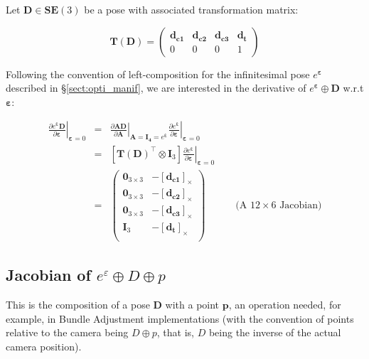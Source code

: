\documentclass[a4paper,11pt]{report}
\newcommand{\E}{{\bm{\varepsilon}}}
\begin{document}
Let $\mathbf{D} \in \mathbf{SE}(3)$ be a pose with associated transformation matrix:

\begin{equation}
\mathbf{T}(\mathbf{D}) = 
\left(
\begin{array}{ccc|c}
 \mathbf{d_{c1}}  & \mathbf{d_{c2}}  & \mathbf{d_{c3}}  & \mathbf{d_{t}}  \\
\hline
  0 & 0 & 0 & 1
\end{array}
\right) 
\end{equation}

Following the convention of left-composition for the infinitesimal 
pose $e^\E$ described in \S\ref{sect:opti_manif},
we are interested in the derivative of $e^\E \oplus \mathbf{D}$ w.r.t $\E$:

\begin{eqnarray}
\left. \frac{\partial e^\E \mathbf{D}}{\partial \E} \right|_{\E = 0}
&=& 
\left. \frac{\partial \mathbf{A} \mathbf{D}}{\partial \mathbf{A} } \right|_{\mathbf{A}=\mathbf{I_4} = e^\E}
\left. \frac{\partial e^\E}{\partial \E} \right|_{\E=0}
\\
&=& 
\left[ \mathbf{T}(\mathbf{D})^\top \otimes  \mathbf{I}_3 \right] 
\left. \frac{\partial e^\E}{\partial \E} \right|_{\E=0}
\\
&=& 
\left(
\begin{array}{cc}
 \mathbf{0}_{3\times 3}  & -[\mathbf{d_{c1}}]_\times \\
 \mathbf{0}_{3\times 3}  & -[\mathbf{d_{c2}}]_\times \\
 \mathbf{0}_{3\times 3}  & -[\mathbf{d_{c3}}]_\times \\
 \mathbf{I}_{3}  & -[\mathbf{d_{t}}]_\times \\
\end{array}
\right)
\quad\quad\quad \text{(A $12 \times 6$ Jacobian)}
\end{eqnarray}


\newpage
\subsection{Jacobian of $e^\varepsilon \oplus D \oplus p$}
\label{sect:jacob_eDp}

This is the composition of a pose $\mathbf{D}$ with a point $\mathbf{p}$, 
an operation needed, for example, in Bundle Adjustment implementations \cite{triggs2000bundle}
(with the convention of points relative to the camera being $D \oplus p$, that is, 
$D$ being the inverse of the actual camera position).
\end{document}
